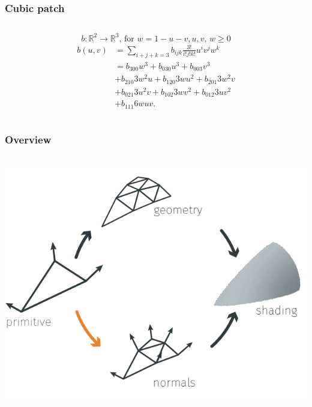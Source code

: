 	\begin{frame}\frametitle{Cubic patch}
		\begin{columns}
			\begin{column}{\textwidth}
				\begin{equation*}
					b: \mathbb{R}^2 \rightarrow \mathbb{R}^3 \text{, for } w = 1 - u - v, u, v \text{, } w \geq 0
				\end{equation*}
				\begin{equation*}
					\begin{aligned}
						b(u,v) & = \sum\limits_{i+j+k=3} b_{ijk} \frac{3!}{i!j!k!} u^i v^j w^k\\
						& = b_{300} w^3 + b_{030} u^3 + b_{003} v^3 \\
						& + b_{210} 3 w^2 u + b_{120} 3 w u^2 + b_{201} 3 w^2 v\\
						& + b_{021} 3 u^2 v + b_{102} 3 w v^2 + b_{012} 3 u v^2\\
						& + b_{111} 6 w u v.
 					\end{aligned}
				\end{equation*}
			\end{column}
		\end{columns}
	\end{frame}

		\begin{frame}\frametitle{Overview}
		\begin{columns}
			\begin{column}{0.9\textwidth}
				\begin{center}	
					\includegraphics[width=\textwidth]{./img/1_single/recap_inputToNormals.png}
				\end{center}		
			\end{column}
		\end{columns}
	\end{frame}	

